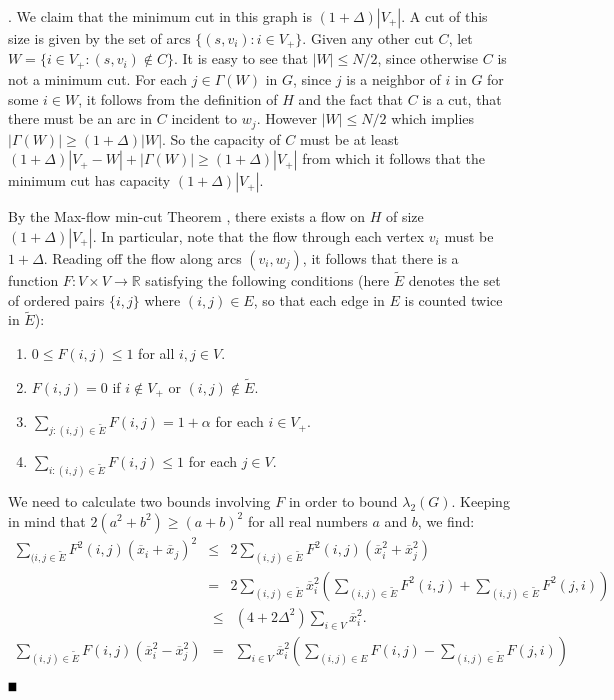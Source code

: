 \documentclass{article}
\newcommand{\bproof}{\noindent{\bf Proof}}
\newcommand{\eproof}{\hspace*{\fill}$\rule{2mm}{2mm}$~~~~\bigskip}
\renewenvironment{proof}{\bproof. }{\eproof}
\newcommand{\R}{\mathbb{R}}
\begin{document}
\begin{proof}
We claim that the minimum cut in this graph is $(1+\Delta )|V_+|$. A cut of this size is given by the set of arcs $\{ (s,v_i):i\in V_+\}$. Given any other cut $C$, let $W=\{ i\in V_+:(s,v_i)\not\in C\}$. It is easy to see that $|W|\leq N/2$, since otherwise $C$ is not a minimum cut. For each $j\in \Gamma (W)$ in $G$, since $j$ is a neighbor of $i$ in $G$ for some $i\in W$, it follows from the definition of $H$ and the fact that $C$ is a cut, that there must be an arc in $C$ incident to $w_j$. However $|W|\leq N/2$ which implies $|\Gamma (W)|\geq (1+\Delta )|W|$. So the capacity of $C$ must be at least $(1+\Delta )|V_+-W|+|\Gamma (W)|\geq (1+\Delta )|V_+|$ from which it follows that the minimum cut has capacity $(1+\Delta )|V_+|$.

By the Max-flow min-cut Theorem \cite[Section 24.2, Theorem 24.6]{CLR2022}, there exists a flow on $H$ of size $(1+\Delta )|V_+|$. In particular, note that the flow through each vertex $v_i$ must be $1+\Delta$. Reading off the flow along arcs $(v_i,w_j)$, it follows that there is a function $F:V\times V\rightarrow \R$ satisfying the following conditions (here $\tilde{E}$ denotes the set of ordered pairs $\{ i,j\}$ where $(i,j)\in E$, so that each edge in $E$ is counted twice in $\tilde{E}$):
\begin{enumerate}
\item $0\leq F(i,j)\leq 1$ for all $i,j\in V$.
\item $F(i,j)=0$ if $i\not\in V_+$ or $(i,j)\not\in \tilde{E}$.
\item $\sum_{j:(i,j)\in \tilde{E}}F(i,j)=1+\alpha$ for each $i\in V_+$.
\item $\sum_{i:(i,j)\in \tilde{E}}F(i,j)\leq 1$ for each $j\in V$.
\end{enumerate}
We need to calculate two bounds involving $F$ in order to bound $\lambda _2(G)$. Keeping in mind that $2(a^2+b^2)\geq (a+b)^2$ for all real numbers $a$ and $b$, we find:
\begin{eqnarray*}
\sum_{(i,j\in \tilde{E}}F^2(i,j)(\overline{x}_i+\overline{x}_j)^2 & \leq & 2\sum_{(i,j)\in \tilde{E}}F^2(i,j)(\overline{x}_i^2+\overline{x}_j^2)\\
 & = & 2\sum_{(i,j)\in \tilde{E}}\overline{x}_i^2\left (\sum_{(i,j)\in \tilde{E}}F^2(i,j)+\sum_{(i,j)\in \tilde{E}}F^2(j,i)\right )
\end{eqnarray*}
\begin{eqnarray*}
 & \leq & (4+2\Delta ^2)\sum_{i\in V}\overline{x}_i^2.\\
\sum_{(i,j)\in\tilde{E}}F(i,j)(\overline{x}_i^2-\overline{x}_j^2) & = & \sum_{i\in V}\overline{x}_i^2\left (\sum_{(i,j)\in E}F(i,j)-\sum_{(i,j)\in \tilde{E}}F(j,i)\right )\\

\end{eqnarray*}
\end{proof}
\end{document}
